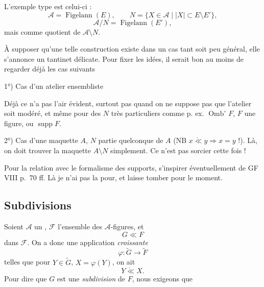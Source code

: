 \documentclass[11pt,a4paper]{article}
\begin{document}
\marginal{\ill{}}

L'exemple type est celui-ci :
\[
  \mathcal{A} = \operatorname{Figelann}(E), \qquad N = \{ X \in \mathcal{A} \mid |X| \subset E \setminus E' \},
\]
\[
  \mathcal{A}/N = \operatorname{Figelann}(E'),
\]
mais \struck{\ill{}}  comme quotient de $\mathcal{A} \setminus N$.

À supposer qu'une telle construction existe dans un cas tant soit peu général, elle s'annonce un tantinet délicate. Pour fixer les idées, il serait bon \struck{\ill{}} au moins de regarder déjà les cas suivants

1°) Cas d'un \struck{\ill{}} atelier ensembliste

\struck{\ill{}} Déjà ce n'a pas l'air évident, surtout pas quand on ne suppose pas que l'atelier soit modéré, et même pour des $N$ très particuliers comme p. ex. $\operatorname{Omb}^{\circ} F$, $F$ une figure, ou $\operatorname{supp} F$.

2°) Cas d'une maquette $A$, $N$ partie quelconque de $A$ (NB $x \mathrel{\mathring{\ll}} y \Rightarrow x = y$ !). Là, on doit trouver la maquette $A \setminus N$ simplement. Ce n'est pas sorcier cette fois !

Pour la relation avec le formalisme des supports, s'inspirer éventuellement de GF VIII p.~70 ff. Là je n'ai pas la  pour, et laisse tomber pour le moment.

\subsection*{Subdivisions}

Soient $\mathcal{A}$ un  , $\mathcal{F}$ l'ensemble des $\mathcal{A}$-figures, et
\[
  G \ll F
\]
dans $\mathcal{F}$. On a donc une application \emph{croissante}
\[
  \varphi : \widetilde{G} \longrightarrow \widetilde{F}
\]
telles que pour $Y \in \widetilde{G}$, $X = \varphi(Y)$, on ait
\[
  Y \mathrel{\mathring{\ll}} X .
\]
Pour dire que $G$ est une \struck{\ill{}} \emph{subdivision} de $F$, nous exigeons  que
\end{document}

